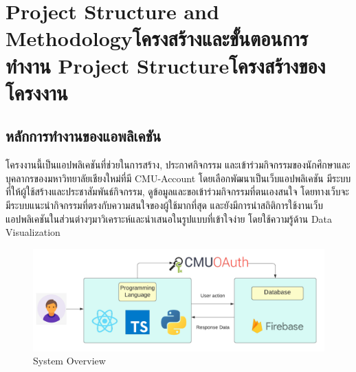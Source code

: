 \chapter{\ifproject%
\ifenglish Project Structure and Methodology\else โครงสร้างและขั้นตอนการทำงาน\fi
\else%
\ifenglish Project Structure\else โครงสร้างของโครงงาน\fi
\fi
}


\makeatletter


\makeatother



\section{หลักการทำงานของแอพลิเคชัน}
โครงงานนี้เป็นแอปพลิเคชันที่ช่วยในการสร้าง, ประกาศกิจกรรม และเข้าร่วมกิจกรรมของนักศึกษาและบุคลากรของมหาวิทยาลัยเชียงใหม่ที่มี CMU-Account
โดยเลือกพัฒนาเป็นเว็บแอปพลิเคชัน มีระบบที่ให้ผู้ใช้สร้างและประชาสัมพันธ์กิจกรรม, ดูข้อมูลและขอเข้าร่วมกิจกรรมที่ตนเองสนใจ โดยทางเว็บจะมีระบบแนะนำกิจกรรมที่ตรงกับความสนใจของผู้ใช้มากที่สุด และยังมีการนำสถิติการใช้งานเว็บแอปพลิเคชันในส่วนต่างๆมาวิเคราะห์และนำเสนอในรูปแบบที่เข้าใจง่าย โดยใช้ความรู้ด้าน Data Visualization
\begin{figure}[h] %
\begin{center}
\includegraphics[width=0.9\linewidth]{image/31_system_overview.png}
\end{center}
\caption[Poem]{System Overview}
\label{fig:system_overview}
\end{figure}
